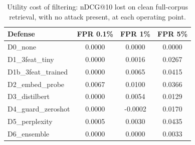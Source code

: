 \begin{table}[t]
\centering
\small
\caption{Utility cost of filtering: nDCG@10 lost on clean full-corpus retrieval, with no attack present, at each operating point.}
\label{tab:utility_cost}
\begin{tabular}{lccc}
\toprule
Defense & FPR 0.1\% & FPR 1\% & FPR 5\% \\
\midrule
D0\_none & 0.0000 & 0.0000 & 0.0000 \\
D1\_3feat\_tiny & 0.0000 & 0.0016 & 0.0267 \\
D1b\_3feat\_trained & 0.0000 & 0.0065 & 0.0415 \\
D2\_embed\_probe & 0.0067 & 0.0100 & 0.0366 \\
D3\_distilbert & 0.0000 & 0.0054 & 0.0129 \\
D4\_guard\_zeroshot & 0.0000 & -0.0002 & 0.0170 \\
D5\_perplexity & 0.0005 & 0.0030 & 0.0435 \\
D6\_ensemble & 0.0000 & 0.0000 & 0.0033 \\
\bottomrule
\end{tabular}
\end{table}
